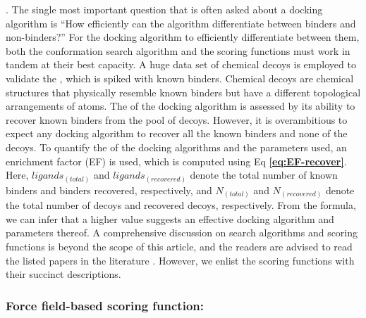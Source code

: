 \documentclass[10pt, a4paper]{book}
\begin{document}
{\color{red}{For a docking tool to be effective and yield reliable result, the search algorithm and the scoring function are crucial and carefully developed}}.  The single most important question that is often asked about a docking algorithm is “How efficiently can the algorithm differentiate between binders and non-binders?” For the docking algorithm to efficiently differentiate between them, both the conformation search algorithm and the scoring functions must work in tandem at their best capacity. A huge data set of chemical decoys is employed to validate the {\color{red}{accuracy}}, which is spiked with known binders. Chemical decoys are chemical structures that physically resemble known binders but have a different topological arrangements of atoms. The {\color{red}{accuracy}} of the docking algorithm is assessed by its ability to recover known binders from the pool of decoys. However, it is overambitious to expect any docking algorithm to recover all the known binders and none of the decoys. To quantify the {\color{red}{accuracy}} of the docking algorithms and the parameters used, an enrichment factor (EF)\cite{bib4} is used, which is computed using Eq \textbf{\ref{eq:EF-recover}}.
{
}
Here, $ligands_{(total)}$ and $ligands_{(recovered)}$ denote the total number of known binders and binders recovered, respectively, and $N_{(total)}$ and $N_{(recovered)}$ denote the total number of decoys and recovered decoys, respectively. From the formula, we can infer that a higher value suggests an effective docking algorithm and parameters thereof. A comprehensive discussion on search algorithms and scoring functions is beyond the scope of this article, and the readers are advised to read the listed papers in the literature \cite{bib5, bib6}. However, we enlist the scoring functions with their succinct descriptions. 

\subsubsection*{Force field-based scoring function:}
\end{document}
